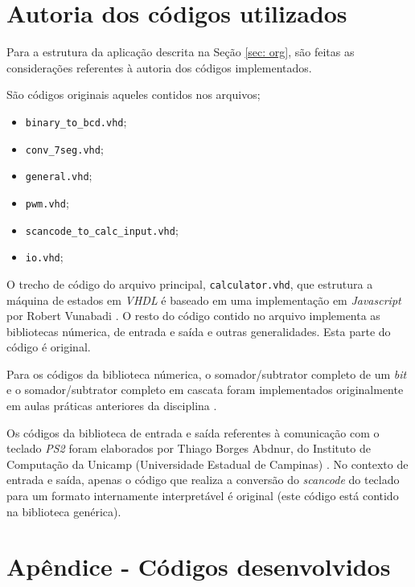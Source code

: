 \documentclass[a4paper,11pt]{article}
\begin{document}
\newpage
\section{Autoria dos códigos utilizados}

Para a estrutura da aplicação descrita na Seção \ref{sec: org}, são feitas as considerações referentes à autoria dos códigos implementados.

São códigos originais aqueles contidos nos arquivos;

\begin{itemize}
	\item \texttt{binary_to_bcd.vhd};
	\item \texttt{conv_7seg.vhd};
	\item \texttt{general.vhd};
	\item \texttt{pwm.vhd};
	\item \texttt{scancode_to_calc_input.vhd};
	\item \texttt{io.vhd};
\end{itemize}

O trecho de código do arquivo principal, \texttt{calculator.vhd}, que estrutura a máquina de estados em \textit{VHDL} é baseado em uma implementação em \textit{Javascript} por Robert Vunabadi \cite{vunabandi}. O resto do código contido no arquivo implementa as bibliotecas númerica, de entrada e saída e outras generalidades. Esta parte do código é original.

Para os códigos da biblioteca númerica, o somador/subtrator completo de um \textit{bit} e o somador/subtrator completo em cascata foram implementados originalmente em aulas práticas anteriores da disciplina \cite{bacurau_somador}. 

Os códigos da biblioteca de entrada e saída referentes à comunicação com o teclado \textit{PS2} foram elaborados por Thiago Borges Abdnur, do Instituto de Computação da Unicamp (Universidade Estadual de Campinas) \cite{abdnur}. No contexto de entrada e saída, apenas o código que realiza a conversão do \textit{scancode} do teclado para um formato internamente interpretável é original (este código está contido na biblioteca genérica).

\newpage




\newpage
\appendix
\section{Apêndice - Códigos desenvolvidos} \label{sec:apend_a}
\end{document}
